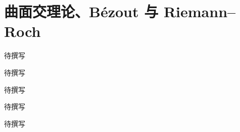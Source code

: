
% 
% 

\chapter{曲面交理论、Bézout 与 Riemann–Roch}
\label{g5:ch:25}

\begin{chapterabstract}
待撰写
\end{chapterabstract}

\begin{learninggoals}
待撰写
\end{learninggoals}

待撰写







\begin{chaptersummary}
待撰写
\end{chaptersummary}

\BookExercises
待撰写
